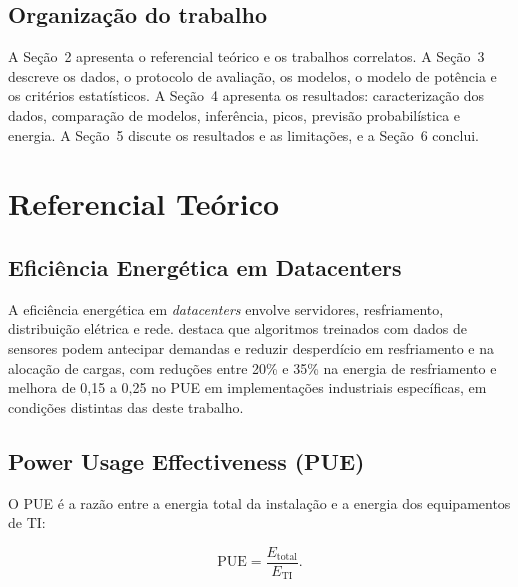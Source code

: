 \documentclass[a4paper,12pt]{article}
\begin{document}
\subsection{Organização do trabalho}

A Seção~2 apresenta o referencial teórico e os trabalhos correlatos. A Seção~3 descreve os dados, o protocolo de avaliação, os modelos, o modelo de potência e os critérios estatísticos. A Seção~4 apresenta os resultados: caracterização dos dados, comparação de modelos, inferência, picos, previsão probabilística e energia. A Seção~5 discute os resultados e as limitações, e a Seção~6 conclui.


\section{Referencial Teórico}

\subsection{Eficiência Energética em Datacenters}

A eficiência energética em \textit{datacenters} envolve servidores, resfriamento, distribuição elétrica e rede.  destaca que algoritmos treinados com dados de sensores podem antecipar demandas e reduzir desperdício em resfriamento e na alocação de cargas, com reduções entre 20\% e 35\% na energia de resfriamento e melhora de 0,15 a 0,25 no PUE em implementações industriais específicas, em condições distintas das deste trabalho.

\subsection{Power Usage Effectiveness (PUE)}
\label{sec:pue-teorico}

O PUE é a razão entre a energia total da instalação e a energia dos equipamentos de TI:

\begin{equation}
    \mathrm{PUE} = \frac{E_{\mathrm{total}}}{E_{\mathrm{TI}}}.
    \label{eq:pue}
\end{equation}
\end{document}
